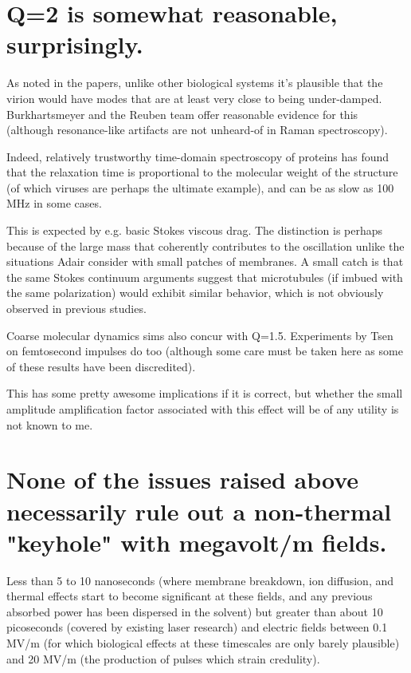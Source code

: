 \documentclass[fleqn,10pt]{paper}
\begin{document}
\section{Q=2 is somewhat reasonable, surprisingly.}

As noted in the papers, unlike other biological systems it's plausible that the virion would have modes that are at least very close to being under-damped. Burkhartsmeyer and the Reuben team offer reasonable evidence for this (although resonance-like artifacts are not unheard-of in Raman spectroscopy). 

Indeed, relatively trustworthy time-domain spectroscopy of proteins \cite{Microwave1994} has found that the relaxation time is proportional to the molecular weight of the structure (of which viruses are perhaps the ultimate example), and can be as slow as 100 MHz in some cases. 

This is expected by e.g. basic Stokes viscous drag. The distinction is perhaps because of the large mass that coherently contributes to the oscillation unlike the situations Adair consider with small patches of membranes. A small catch is that the same Stokes continuum arguments suggest that microtubules (if imbued with the same polarization) would exhibit similar behavior, which is not obviously observed in previous studies.

Coarse molecular dynamics sims also concur with Q=1.5. Experiments by Tsen on femtosecond impulses 
do too (although some care must be taken here as some of these results have been discredited).

This has some pretty awesome implications if it is correct, but whether the small amplitude 
amplification factor associated with this effect will be of any utility is not known to me.

\section{None of the issues raised above necessarily rule out a non-thermal "keyhole" with 
megavolt/m fields.}



Less than 5 to 10 nanoseconds (where membrane breakdown, ion diffusion, and thermal effects start to become significant at these fields, and any previous absorbed power has been dispersed in the solvent) but greater than about 10 picoseconds (covered by existing laser research) and electric fields between 0.1 MV/m (for which biological effects at these timescales are only barely plausible) and 20 MV/m (the production of pulses which strain credulity).
\end{document}
